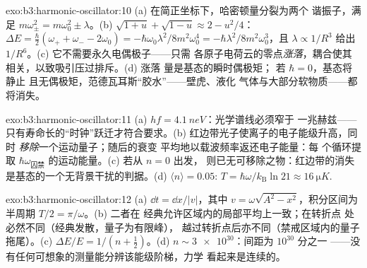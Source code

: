 \begin{solution}{exo:b3:harmonic-oscillator:10}
(a) 在简正坐标下，哈密顿量分裂为两个
谐振子，满足 $m\omega_\pm^2 = m\omega_0^2 \pm \lambda$。(b)
$\sqrt{1 + u} + \sqrt{1 - u} \approx 2 - u^2/4$：$\Delta E =
\tfrac\hbar2(\omega_+ + \omega_- - 2\omega_0) =
-\hbar\omega_0\lambda^2/8m^2\omega_0^4 =
-\hbar\lambda^2/8m^2\omega_0^3$，且 $\lambda \propto 1/R^3$ 给出
$1/R^6$。(c) 它不需要永久电偶极子——只需
各原子电荷云的零点\emph{涨落}，耦合使其
相关，以致吸引压过排斥。(d) 涨落
量是基态的瞬时偶极矩；
若 $\hbar = 0$，基态将静止
且无偶极矩，范德瓦耳斯“胶水”——壁虎、液化
气体与大部分软物质——都将消失。
\end{solution}

\begin{solution}{exo:b3:harmonic-oscillator:11}
(a) $hf = \qty{4.1}{neV}$：光学谱线必须窄于
一兆赫兹——只有寿命长的“时钟”跃迁才符合要求。(b)
红边带光子使离子的电子能级升高，同时
\emph{移除}一个运动量子；随后的衰变
平均地以载波频率返还电子能量：每
个循环提取 $\hbar\omega_{\text{囚禁}}$ 的运动能量。(c) 若从 $n = 0$ 出发，
则已无可移除之物：红边带的消失
是基态的一个无背景干扰的判据。(d)
$\langle n\rangle = 0.05$: $T = \hbar\omega/k_{\text{B}}\ln21
\approx \qty{16}{\micro K}$.
\end{solution}

\begin{solution}{exo:b3:harmonic-oscillator:12}
(a) $\dd t = \dd x/|v|$，其中 $v = \omega\sqrt{A^2 - x^2}$，积分区间为
半周期 $T/2 = \pi/\omega$。(b) 二者在
经典允许区域内的局部平均上一致；在转折点
处必然不同（经典发散，量子为有限峰），
越过转折点后亦不同（禁戒区域内的量子拖尾）。(c) $\Delta E/E = 1/(n +
\tfrac12)$。(d) $n \sim \num{3e30}$：间距为 $10^{30}$ 分之一
——没有任何可想象的测量能分辨该能级阶梯，力学
看起来是连续的。
\end{solution}

